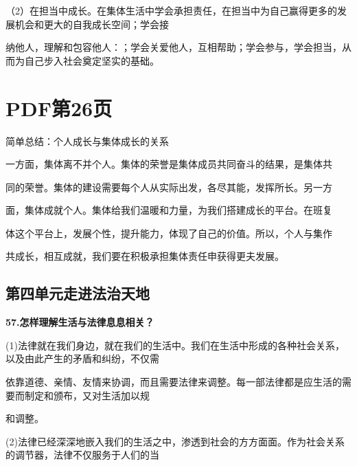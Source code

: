 \documentclass[lang=cn,11pt]{elegantbook}
\begin{document}
（2）在担当中成长。在集体生活中学会承担责任，在担当中为自己赢得更多的发展机会和更大的自我成长空间；学会接\par

纳他人，理解和包容他人：；学会关爱他人，互相帮助；学会参与，学会担当，从而为自己步入社会奠定坚实的基础。\par


\section*{PDF第26页}

简单总结：个人成长与集体成长的关系\par

一方面，集体离不并个人。集体的荣誉是集体成员共同奋斗的结果，是集体共\par

同的荣誉。集体的建设需要每个人从实际出发，各尽其能，发挥所长。另一方\par

面，集体成就个人。集体给我们温暖和力量，为我们搭建成长的平台。在班复\par

体这个平台上，发展个性，提升能力，体现了自己的价值。所以，个人与集作\par

共成长，相互成就，我们要在积极承担集体责任申获得更夫发展。\par

\subsection*{第四单元走进法治天地}

\textbf{57.怎样理解生活与法律息息相关？}\par

(1)法律就在我们身边，就在我们的生活中。我们在生活中形成的各种社会关系，以及由此产生的矛盾和纠纷，不仅需\par

依靠道德、亲情、友情来协调，而且需要法律来调整。每一部法律都是应生活的需要而制定和颁布，又对生活加以规\par

和调整。\par

(2)法律已经深深地嵌入我们的生活之中，渗透到社会的方方面面。作为社会关系的调节器，法律不仅服务于人们的当\par
\end{document}
